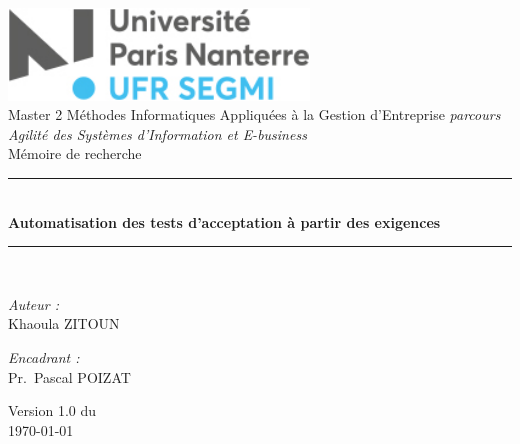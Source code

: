 \documentclass[openany,12pt]{book}
\begin{document}

\begin{titlepage}
\begin{center}

\includegraphics[width=0.6\textwidth]{logoNanterre.jpg}\\[1cm]

{\large Master 2 Méthodes Informatiques Appliquées à la Gestion d'Entreprise \textit{parcours Agilité des Systèmes d'Information et E-business}}\\[0.5cm]

{\large Mémoire de recherche}\\[0.5cm]

\rule{\linewidth}{0.5mm} \\[0.4cm]
{ \huge \bfseries Automatisation des tests d'acceptation à partir des exigences \\[0.4cm] }
\rule{\linewidth}{0.5mm} \\[1.5cm]

\noindent
\begin{minipage}{0.4\textwidth}
  \begin{flushleft} \large
    \emph{Auteur :}\\
    Khaoula \textsc{ZITOUN}\\
  \end{flushleft}
\end{minipage}%
\begin{minipage}{0.4\textwidth}
  \begin{flushright} \large
    \emph{Encadrant :} \\
    Pr.~Pascal \textsc{POIZAT}\\
  \end{flushright}
\end{minipage}

\vfill

{\large Version 1.0 du\\ \today}

\end{center}
\end{titlepage}

\end{document}
